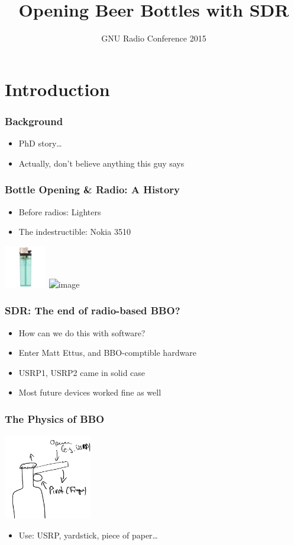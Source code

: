 \documentclass{beamer}
\title{Opening Beer Bottles with SDR}
\institute{Martin Braun}
\date{GNU Radio Conference 2015}
\begin{document}
\frame{\titlepage}

\section{Introduction}

\begin{frame}
  \frametitle{Background}
  \begin{itemize}
    \item<1> PhD story\ldots
    \item<2> Actually, don't believe anything this guy says
  \end{itemize}
\end{frame}

\begin{frame}
  \frametitle{Bottle Opening \& Radio: A History}
  \begin{itemize}
    \item Before radios: Lighters
    \item<2-> The indestructible: Nokia 3510
  \end{itemize}
  \hspace{2cm}
  \includegraphics[height=5em]{lighter.jpeg}
  \hspace{1em}
  \includegraphics<2->[height=5em]{Nokia-3510.jpg}
\end{frame}

\begin{frame}
  \frametitle{SDR\@: The end of radio-based BBO?}
  \begin{itemize}
    \item How can we do this with software?
    \item<2-> Enter Matt Ettus, and BBO-comptible hardware
    \item<2-> USRP1, USRP2 came in solid case
    \item<2-> Most future devices worked fine as well
  \end{itemize}
\end{frame}

\begin{frame}
  \frametitle{The Physics of BBO}
  \begin{center}
  \includegraphics[height=10em]{physics.jpg}
  \end{center}
  \begin{itemize}
    \item Use: USRP, yardstick, piece of paper\ldots
  \end{itemize}
\end{frame}
\end{document}
